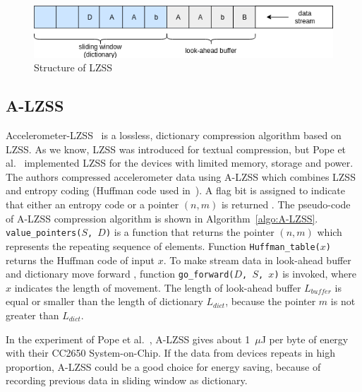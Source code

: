 \begin{figure}
    \centering
    \includegraphics[width=\textwidth]{figures/LZSS.png}
    \caption{Structure of LZSS}
    \label{fig:LZSS}
\end{figure}

\subsection{A-LZSS}
Accelerometer-LZSS~\cite{pope2018accelerometer} is a lossless, dictionary
compression algorithm based on LZSS. As we know, LZSS was introduced
for textual compression, but Pope et al.~\cite{pope2018accelerometer}
implemented LZSS for the devices with limited memory, storage and power. The
authors compressed accelerometer data using A-LZSS which combines LZSS and
entropy coding (Huffman code used in~\cite{pope2018accelerometer}). A flag bit is
assigned to indicate that either an entropy code or a pointer $(n, m)$ is returned . The
pseudo-code of A-LZSS compression algorithm is shown in
Algorithm~\ref{algo:A-LZSS}. \texttt{value\_pointers($S$, $D$)} is a function
that returns the pointer $(n, m)$ which represents the repeating sequence of
elements. Function \texttt{Huffman\_table($x$)} returns the Huffman code of
input $x$. To make stream data in look-ahead buffer and dictionary
move forward , function \texttt{go\_forward($D$, $S$, $x$)} is invoked,
where $x$ indicates the length of movement. The length of look-ahead buffer
$L_{buffer}$ is equal or smaller than the length of dictionary $L_{dict}$,
because the pointer $m$ is not greater than $L_{dict}$. 

In the experiment of Pope et al.~\cite{pope2018accelerometer}, A-LZSS gives
about 1~$\mu$J per byte of energy  with their CC2650 System-on-Chip. If the data from devices
repeats in high proportion, A-LZSS could be a good choice for energy
saving, because of recording previous data in sliding window as dictionary.

